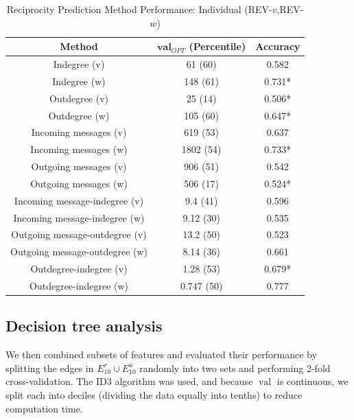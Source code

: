 \documentclass[conference]{IEEEtran}
\begin{document}
\begin{table}[!t]
\renewcommand{\arraystretch}{1.3}
\caption{Reciprocity Prediction Method Performance: Individual (REV-$v$,REV-$w$)}
\label{table_recresults_indivVW}
\centering
\begin{tabular}{|c||c|c|}
\hline
\bf{Method} & $\mathbf{val}_{OPT}$ (Percentile) & \bf{Accuracy} \\
\hline
Indegree (v) &  61 (60) & 0.582 \\
Indegree (w) & 148 (61) & 0.731* \\
Outdegree (v) & 25 (14) & 0.506* \\
Outdegree (w) & 105 (60) & 0.647* \\
\hline
Incoming messages (v) & 619 (53) & 0.637 \\
Incoming messages (w) & 1802 (54) & 0.733* \\
Outgoing messages (v) & 906 (51) & 0.542 \\
Outgoing messages (w) & 506 (17) & 0.524* \\
\hline
Incoming message-indegree (v) & 9.4 (41) & 0.596 \\
Incoming message-indegree (w) & 9.12 (30) & 0.535 \\
Outgoing message-outdegree (v) & 13.2 (50) & 0.523 \\
Outgoing message-outdegree (w) & 8.14 (36) & 0.661 \\
\hline
Outdegree-indegree (v) & 1.28 (53) & 0.679* \\
Outdegree-indegree (w) & 0.747 (50) & 0.777 \\
\hline
\end{tabular}
\end{table}

\subsection{Decision tree analysis}

We then combined subsets of features and evaluated their performance by splitting the edges in $E^r_{10} \cup E_{10}^u$ randomly into two sets and performing 2-fold cross-validation. The ID3 algorithm was used, and because $\operatorname{val}$ is continuous, we split each into deciles (dividing the data equally into tenths) to reduce computation time.
\end{document}

